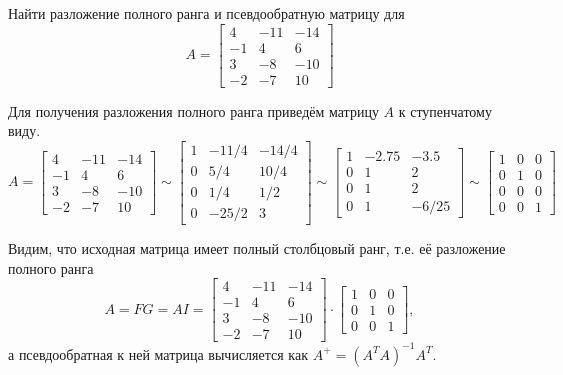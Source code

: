 
\begin{problem}
    Найти разложение полного ранга и псевдообратную матрицу для
    \begin{equation*}
        A =
        \begin{bmatrix}
            4 & -11 & -14\\
            -1 & 4 & 6\\
            3 & -8 & -10\\
            -2 & -7 & 10
        \end{bmatrix}
    \end{equation*}
\end{problem}


Для получения разложения полного ранга приведём матрицу $A$ к ступенчатому
виду.
\begin{equation*}
    A =
    \begin{bmatrix}
        4 & -11 & -14\\
        -1 & 4 & 6\\
        3 & -8 & -10\\
        -2 & -7 & 10
    \end{bmatrix}
    \sim
    \begin{bmatrix}
        1 & -11/4 & -14/4\\
        0 & 5/4 & 10/4\\
        0 & 1/4 & 1/2\\
        0 & -25/2 & 3
    \end{bmatrix}
    \sim
    \begin{bmatrix}
        1 & -2.75 & -3.5\\
        0 & 1 & 2\\
        0 & 1 & 2\\
        0 & 1 & -6/25
    \end{bmatrix}
    \sim
    \begin{bmatrix}
        1 & 0 & 0\\
        0 & 1 & 0\\
        0 & 0 & 0\\
        0 & 0 & 1
    \end{bmatrix}
\end{equation*}

Видим, что исходная матрица имеет полный столбцовый ранг, т.е. её разложение
полного ранга
\begin{equation*}
    A = F G = A I =
    \begin{bmatrix}
        4 & -11 & -14\\
        -1 & 4 & 6\\
        3 & -8 & -10\\
        -2 & -7 & 10
    \end{bmatrix}
    \cdot
    \begin{bmatrix}
        1 & 0 & 0\\
        0 & 1 & 0\\
        0 & 0 & 1
    \end{bmatrix},
\end{equation*}
а псевдообратная к ней матрица вычисляется как
$A^+ = (A^TA)^{-1}A^T$.

